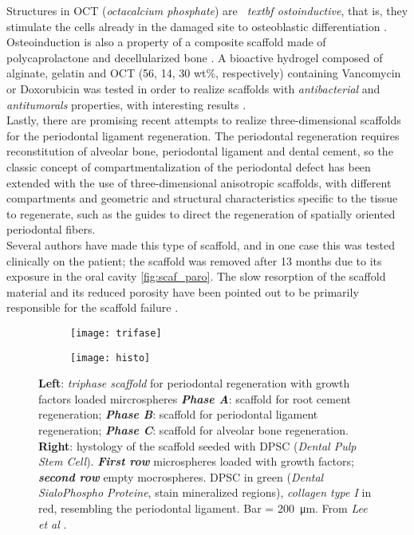 Structures in OCT (\emph{octacalcium phosphate}) are \emph{\ textbf {ostoinductive}}, that is, they stimulate the cells already in the damaged site to osteoblastic differentiation \parencite{Reference130}. Osteoinduction is also a property of a composite scaffold made of polycaprolactone and decellularized bone \parencite{Reference132}. A bioactive hydrogel composed of alginate, gelatin and OCT (56, 14, 30 wt\%, respectively) containing Vancomycin or Doxorubicin was tested in order to realize scaffolds with \emph{antibacterial} and \emph{antitumorals} properties, with interesting results \parencite{Reference133}. \\
Lastly, there are promising recent attempts to realize three-dimensional scaffolds for the periodontal ligament regeneration. The periodontal regeneration requires reconstitution of alveolar bone, periodontal ligament and dental cement, so the classic concept of compartmentalization of the periodontal defect has been extended with the use of three-dimensional anisotropic scaffolds, with different compartments and geometric and structural characteristics specific to the tissue to regenerate, such as the guides to direct the regeneration of spatially oriented periodontal fibers. \\
Several authors have made this type of scaffold, and in one case this was tested clinically on the patient; the scaffold was removed after 13 months due to its exposure in the oral cavity \ref{fig:scaf_paro}. The slow resorption of the scaffold material and its reduced porosity have been pointed out to be primarily responsible for the scaffold failure \parencite{Reference134}. \\

\begin{figure}[h!]
 
\begin{subfigure}{0.5\textwidth}
\centering
\texttt{[image: trifase]} 
\label{fig:trifase}
\end{subfigure}
\begin{subfigure}{0.5\textwidth}
\centering
\texttt{[image: histo]}
\label{fig:histo}
\end{subfigure}
\caption{\textbf{Left}: \emph{triphase scaffold} for periodontal regeneration with growth factors loaded mircrospheres \emph{\textbf{Phase A}}: scaffold for root cement regeneration; \emph{\textbf{Phase B}}: scaffold for periodontal ligament regeneration; \emph{\textbf{Phase C}}: scaffold for alveolar bone regeneration. \textbf{Right}: hystology of the scaffold seeded with DPSC (\emph{Dental Pulp Stem Cell}). \emph{\textbf{First row}} microspheres loaded with growth factors; \emph{\textbf{second row}} empty mocrospheres. DPSC in green (\emph{Dental SialoPhospho Proteine}, stain mineralized regions), \emph{collagen type I} in red, resembling the periodontal ligament. Bar = \SI {200} {\micro\metre}. From \emph{Lee et al} \parencite{Reference135}.}
\label{fig:scaffold_trifase}
\end{figure}
\pagebreak

